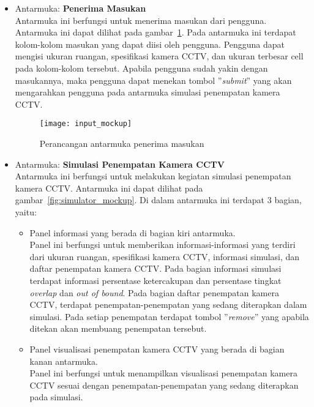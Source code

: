 \begin{itemize}
	\item Antarmuka: \textbf{Penerima Masukan}\\
	Antarmuka ini berfungsi untuk menerima masukan dari pengguna. Antarmuka ini dapat dilihat pada gambar~\ref{fig:input_mockup}. Pada antarmuka ini terdapat kolom-kolom masukan yang dapat diisi oleh pengguna. Pengguna dapat mengisi ukuran ruangan, spesifikasi kamera CCTV, dan ukuran terbesar cell pada kolom-kolom tersebut. Apabila pengguna sudah yakin dengan masukannya, maka pengguna dapat menekan tombol ''\textit{submit}'' yang akan mengarahkan pengguna pada antarmuka simulasi penempatan kamera CCTV.

	\begin{figure}[h]
		\centering  
		\texttt{[image: input\_mockup]}
		\caption[Perancangan antarmuka penerima masukan]{Perancangan antarmuka penerima masukan}
		\label{fig:input_mockup}
	\end{figure}

	\item Antarmuka: \textbf{Simulasi Penempatan Kamera CCTV}\\
	Antarmuka ini berfungsi untuk melakukan kegiatan simulasi penempatan kamera CCTV. Antarmuka ini dapat dilihat pada gambar~\ref{fig:simulator_mockup}. Di dalam antarmuka ini terdapat 3 bagian, yaitu:
	\begin{itemize}
		\item Panel informasi yang berada di bagian kiri antarmuka.\\
		Panel ini berfungsi untuk memberikan informasi-informasi yang terdiri dari ukuran ruangan, spesifikasi kamera CCTV, informasi simulasi, dan daftar penempatan kamera CCTV. Pada bagian informasi simulasi terdapat informasi persentase ketercakupan dan persentase tingkat \textit{overlap} dan \textit{out of bound}. Pada bagian daftar penempatan kamera CCTV, terdapat penempatan-penempatan yang sedang diterapkan dalam simulasi. Pada setiap penempatan terdapat tombol ''\textit{remove}'' yang apabila ditekan akan membuang penempatan tersebut.
		
		\item Panel visualisasi penempatan kamera CCTV yang berada di bagian kanan antarmuka.\\
		Panel ini berfungsi untuk menampilkan visualisasi penempatan kamera CCTV sesuai dengan penempatan-penempatan yang sedang diterapkan pada simulasi.
		

\end{itemize}
\end{itemize}
